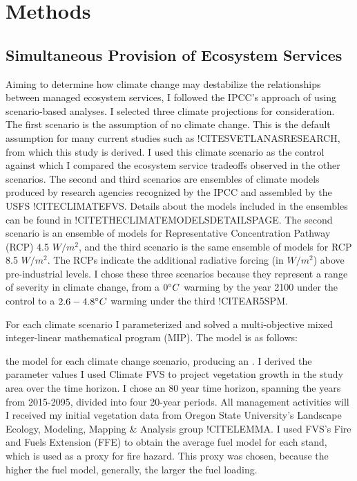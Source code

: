 \section{Methods}
\subsection{Simultaneous Provision of Ecosystem Services}
\label{subsec:multiObjModel}
Aiming to determine how climate change may destabilize the relationships between managed ecosystem services, I followed the IPCC's approach of using scenario-based analyses. I selected three climate projections for consideration. The first scenario is the assumption of no climate change. This is the default assumption for many current studies such as !CITESVETLANASRESEARCH, from which this study is derived. I used this climate scenario as the control against which I  compared the ecosystem service tradeoffs observed in the other scenarios. The second and third scenarios are ensembles of climate models produced by research agencies recognized by the IPCC and assembled by the USFS !CITECLIMATEFVS. Details about the models included in the ensembles can be found in !CITETHECLIMATEMODELSDETAILSPAGE. The second scenario is an ensemble of models for Representative Concentration Pathway (RCP) 4.5 $W/m^2$, and the third scenario is the same ensemble of models for RCP 8.5 $W/m^2$. The RCPs indicate the additional radiative forcing (in $W/m^2$) above pre-industrial levels. I chose these three scenarios because they represent a range of severity in climate change, from a $0 \degree C$ warming by the year 2100 under the control to a $2.6-4.8 \degree C$ warming under the third !CITEAR5SPM.

For each climate scenario I parameterized and solved a multi-objective mixed integer-linear mathematical program (MIP). The model is as follows:



the model for each climate change scenario, producing an . I derived the parameter values  I used Climate FVS to project vegetation growth in the study area over the time horizon. I chose an 80 year time horizon, spanning the years from 2015-2095, divided into four 20-year periods. All management activities will  I received my initial vegetation data from Oregon State University's Landscape Ecology, Modeling, Mapping \& Analysis group !CITELEMMA. I used FVS's Fire and Fuels Extension (FFE) to obtain the average fuel model for each stand, which is used as a proxy for fire hazard. This proxy was chosen, because the higher the fuel model, generally, the larger the fuel loading.

